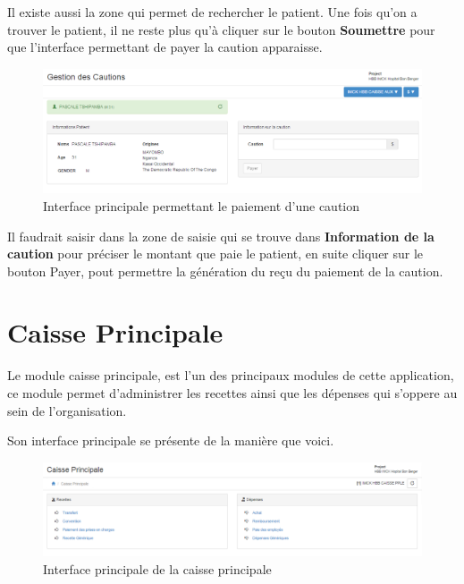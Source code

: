 \documentclass[12pt,a4paper]{report}
\begin{document}
Il existe aussi la zone qui permet de rechercher le patient. Une fois qu'on a trouver le patient, il ne reste plus qu'à cliquer sur le bouton \textbf{Soumettre} pour que l'interface permettant de payer la caution apparaisse.

\begin{figure}[h]
\begin{center}
\includegraphics[width=14cm]{pic/formGestionCaution.png}
\end{center}
\caption{Interface principale permettant le paiement d'une caution}
\label{Interface principale permettant le paiement d'une caution}
\end{figure}

Il faudrait saisir dans la zone de saisie qui se trouve dans \textbf{Information de la caution} pour préciser le montant que paie le patient, en suite cliquer sur le bouton Payer, pout permettre la génération du reçu du paiement de la caution.

\newpage
\section{Caisse Principale}
Le module caisse principale, est l'un des principaux modules de cette application, ce module permet d'administrer les recettes ainsi que les dépenses qui s'oppere au sein de l'organisation.

Son interface principale se présente de la manière que voici.

\begin{figure}[h]
\begin{center}
\includegraphics[width=14cm]{pic/caissePrincipale.png}
\end{center}
\caption{Interface principale de la caisse principale}
\label{Interface principale de la caisse principale}
\end{figure}
\end{document}
